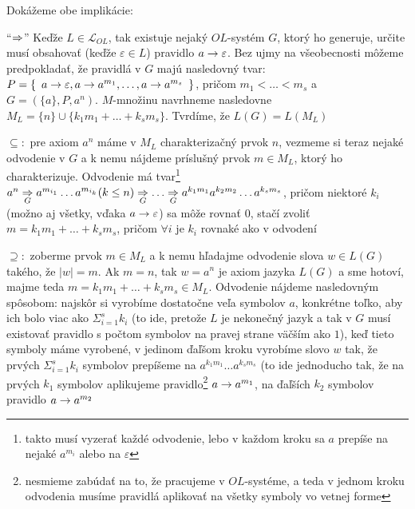 \begin{dokaz}
    Dokážeme obe implikácie:
    \begin{description}
    \item{``$\Rightarrow$''} Keďže $L\in\mathcal{L}_{OL}$, tak existuje nejaký
    $OL$-systém $G$, ktorý ho generuje, určite musí obsahovať (keďže
    $\varepsilon\in L$) pravidlo $a\rightarrow\varepsilon$. Bez ujmy na
    všeobecnosti môžeme predpokladať, že pravidlá v $G$ majú
    nasledovný tvar: $P=\{\enspace a\rightarrow\varepsilon,a\rightarrow
    a^{m_{1}},\dots,a\rightarrow a^{m_{s}}\enspace\}$, pričom $m_{1}<\dots<m_{s}$
    a $G=(\{a\},P,a^{n})$. $M$-množinu navrhneme nasledovne
    $M_{L}=\{n\}\cup\{k_{1}m_{1}+\dots+k_{s}m_{s}\}$. Tvrdíme, že
    $L(G)=L(M_{L})$
    \begin{description}
    \item{$\subseteq:$} pre axiom $a^{n}$ máme v $M_{L}$
    charakterizačný prvok $n$, vezmeme si teraz nejaké odvodenie v $G$
    a k nemu nájdeme príslušný prvok $m\in M_{L}$, ktorý ho
    charakterizuje. Odvodenie má tvar\footnote{takto musí vyzerať
    každé odvodenie, lebo v každom kroku sa $a$ prepíše na nejaké
    $a^{m_{i}}$ alebo na $\varepsilon$} $a^{n}\underset{G}{\Rightarrow}
    a^{m_{i_{1}}}\dots a^{m_{i_{k}}}(k\leq
    n)\underset{G}{\Rightarrow}\dots\underset{G}{\Rightarrow}
    a^{k_{1}m_{1}}a^{k_{2}m_{2}}\dots a^{k_{s}m_{s}}$, pričom niektoré
    $k_{i}$ (možno aj všetky, vďaka $a\rightarrow\varepsilon$) sa môže rovnať
    $0$, stačí zvoliť $m=k_{1}m_{1}+\dots+k_{s}m_{s}$, pričom $\forall
    i$ je $k_{i}$ rovnaké ako v odvodení
    \item{$\supseteq:$} zoberme prvok $m\in M_{L}$ a k nemu hľadajme
    odvodenie slova $w\in L(G)$ takého, že $|w|=m$. Ak $m=n$, tak
    $w=a^{n}$ je axiom jazyka $L(G)$ a sme hotoví, majme teda
    $m=k_{1}m_{1}+\dots+k_{s}m_{s}\in M_{L}$. Odvodenie nájdeme
    nasledovným spôsobom: najskôr si vyrobíme dostatočne veľa symbolov
    $a$, konkrétne  toľko, aby ich bolo viac ako
    $\Sigma_{i=1}^{s}k_{i}$ (to ide, pretože $L$ je nekonečný jazyk a
    tak v $G$ musí existovať pravidlo s počtom symbolov na pravej
    strane väčším ako $1$), keď tieto symboly máme vyrobené, v jedinom
    ďaľšom kroku vyrobíme slovo $w$ tak, že prvých
    $\Sigma_{i=1}^{s}k_{i}$ symbolov prepíšeme na $a^{k_{1}m_{1}}\dots
    a^{k_{s}m_{s}}$ (to ide jednoducho tak, že na prvých $k_{1}$
    symbolov aplikujeme pravidlo\footnote{nesmieme zabúdať na to, že
    pracujeme v $OL$-systéme, a teda v jednom kroku odvodenia musíme
    pravidlá aplikovať na všetky symboly vo vetnej forme} $a\rightarrow
    a^{m_{1}}$, na ďaľších $k_{2}$ symbolov pravidlo $a\rightarrow a^{m_{2}}$

\end{description}
\end{description}
\end{dokaz}
